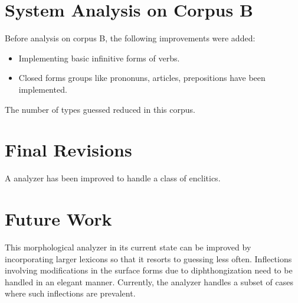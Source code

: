 \documentclass[11pt,letterpaper]{article}
\begin{document}
\section{System Analysis on Corpus B}

Before analysis on corpus B, the following improvements were added:
\begin{itemize}
\item Implementing basic infinitive forms of verbs.
\item Closed forms groups like prononuns, articles, prepositions have been implemented.
\end{itemize}

The number of types guessed reduced in this corpus.

\section{Final Revisions}
A analyzer has been improved to handle a class of enclitics. 

\section{Future Work}
This morphological analyzer in its current state can be improved by incorporating larger lexicons so that it resorts to guessing less often. Inflections involving modifications in the surface forms due to diphthongization need to be handled in an elegant manner. Currently, the analyzer handles a subset of cases where such inflections are prevalent.







\label{lastpage}
\end{document}
